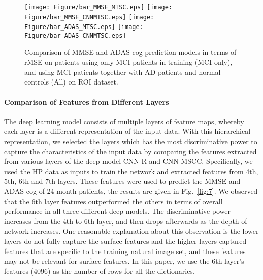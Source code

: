 \documentclass[10pt,twocolumn,letterpaper]{article}
\begin{document}
\begin{figure*}[t]
\centering
\texttt{[image: Figure/bar\_MMSE\_MTSC.eps]}
\texttt{[image: Figure/bar\_MMSE\_CNNMTSC.eps]}
\texttt{[image: Figure/bar\_ADAS\_MTSC.eps]}
\texttt{[image: Figure/bar\_ADAS\_CNNMTSC.eps]}
\vspace{-0.5em}
\caption{Comparison of MMSE and ADAS-cog prediction models in terms of rMSE on patients using only MCI patients in training (MCI only), and using MCI patients together with AD patients and normal controls (All) on ROI dataset. }
\label{fig:6}
\vspace{-1em}
\end{figure*}
\vspace{0.5em}
\paragraph{Comparison of Features from Different Layers} The deep learning model consists of multiple layers of feature maps, whereby each layer is a different representation of the input data. With this hierarchical representation, we selected the layers which has the most discriminative power to capture the characteristics of the input data by comparing the features extracted from various layers of the deep model CNN-R and CNN-MSCC. Specifically, we used the HP data as inputs to train the network and extracted features from 4th, 5th, 6th and 7th layers. These features were used to predict the MMSE and ADAS-cog of 24-month patients, the results are given in Fig.~\ref{fig:7}. We observed that the 6th layer features outperformed the others in terms of overall performance in all three different deep models. The discriminative power increases from the 4th to 6th layer, and then drops afterwards as the depth of network increases. One reasonable explanation about this observation is the lower layers do not fully capture the surface features and the higher layers captured features that are specific to the training natural image set, and these features may not be relevant for surface features. In this paper, we use the 6th layer's features (4096) as the number of rows for all the dictionaries.
\end{document}
